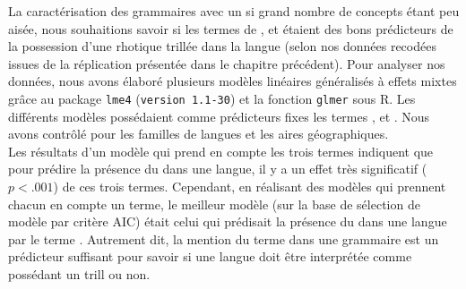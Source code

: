 La caractérisation des grammaires avec un si grand nombre de concepts étant peu aisée, nous souhaitions savoir si les termes de ,  et  étaient des bons prédicteurs de la possession d'une rhotique trillée dans la langue (selon nos données recodées issues de la réplication présentée dans le chapitre précédent).
Pour analyser nos données, nous avons élaboré plusieurs modèles linéaires généralisés à effets mixtes grâce au package \texttt{lme4} (\texttt{version 1.1-30}) et la fonction \texttt{glmer} \parencite{batesFittingLinearMixedeffects2015} sous R. Les différents modèles possédaient comme prédicteurs fixes les termes ,  et . Nous avons contrôlé pour les familles de langues et les aires géographiques.\\

Les résultats d'un modèle qui prend en compte les trois termes indiquent que pour prédire la présence du  dans une langue, il y a un effet très significatif ($p < .001$) de ces trois termes. Cependant, en réalisant des modèles qui prennent chacun en compte un terme, le meilleur modèle (sur la base de sélection de modèle par critère AIC) était celui qui prédisait la présence du  dans une langue par le terme . Autrement dit, la mention du terme  dans une grammaire est un prédicteur suffisant pour savoir si une langue doit être interprétée comme possédant un trill ou non.




